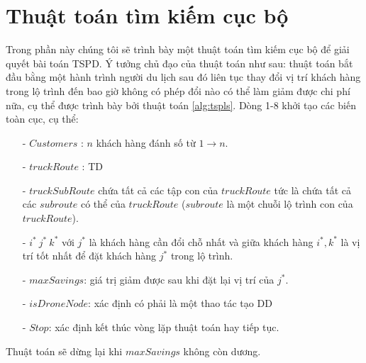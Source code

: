 \documentclass[a4paper,12pt]{report}
\begin{document}
\section{Thuật toán tìm kiếm cục bộ}
\label{section:tsp-ls}
Trong phần này chúng tôi sẽ trình bày một thuật toán tìm kiếm cục bộ để giải quyết bài toán TSPD. Ý tưởng chủ đạo của thuật toán như sau: thuật toán bắt đầu bằng một hành trình người du lịch sau đó liên tục thay đổi vị trí khách hàng trong lộ trình đến bao giờ không có phép đổi nào có thể làm giảm được chi phí nữa, cụ thể được trình bày bởi thuật toán \ref{alg:tspls}. Dòng 1-8 khởi tạo các biến toàn cục, cụ thể:
\begin{itemize}
\item[-] $Customers$ : $n$ khách hàng đánh số từ $1\rightarrow n$.
\item[-] $truckRoute$ : \ac{TD}
\item[-] $truckSubRoute$ chứa  tất cả các tập con của $truckRoute$ tức là chứa tất cả các $subroute$ có thể của $truckRoute$ ($subroute$ là một chuỗi lộ trình con của $truckRoute$).
\item[-] $i^* \ j^* \ k^*$ với $j^*$ là khách hàng cần đổi chỗ nhất và giữa khách hàng $i^* ,k^*$ là vị trí tốt nhất để đặt khách hàng $j^*$ trong lộ trình.
\item[-] $maxSavings$: giá trị giảm được sau khi đặt lại vị trí của $j^*$.
\item[-] $isDroneNode$: xác định có phải là một thao tác tạo \ac{DD}
\item[-] $Stop$: xác định kết thúc vòng lặp thuật toán hay tiếp tục.
\end{itemize}
Thuật toán sẽ dừng lại khi $maxSavings$ không còn dương. \\
\end{document}
